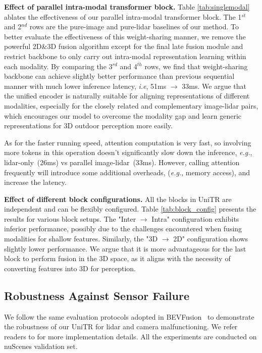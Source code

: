 \documentclass[10pt,twocolumn,letterpaper]{article}
\begin{document}
\noindent \textbf{Effect of parallel intra-modal transformer block.} Table \ref{tab:singlemodal} ablates the effectiveness of our parallel intra-modal transformer block. The 1$^{st}$ and 2$^{nd}$ rows are the pure-image and pure-lidar baselines of our method. To better evaluate the effectiveness of this weight-sharing manner, we remove the powerful 2D\&3D fusion algorithm except for the final late fusion module and restrict backbone to only carry out intra-modal representation learning within each modality. By comparing the 3$^{rd}$ and 4$^{th}$ rows, we find that weight-sharing backbone can achieve slightly better performance than previous sequential manner with much lower inference latency, \emph{i.e}, 51ms $\rightarrow$ 33ms.  We argue that the unified encoder is naturally suitable for aligning representations of different modalities, especially for the closely related and complementary image-lidar pairs, which encourages our model to overcome the modality gap and learn generic representations for 3D outdoor perception more easily. 

As for the faster running speed, attention computation is very fast, so involving more tokens in this operation doesn't significantly slow down the inference, \emph{e.g.}, lidar-only~(26ms) vs parallel image-lidar~(33ms). However, calling attention frequently will introduce some additional overheads, (\textit{e.g.}, memory access), and increase the latency. 


\noindent \textbf{Effect of different block configurations.} All the blocks in UniTR are independent and can be flexibly configured. Table \ref{tab:block_config} presents the results for various block setups. The "Inter $\rightarrow$ Intra" configuration exhibits inferior performance, possibly due to the challenges encountered when fusing modalities for shallow features. Similarly, the "3D $\rightarrow$ 2D" configuration shows slightly lower performance.  We argue that it is more advantageous for the last block to perform fusion in the 3D space, as it aligns with the necessity of converting features into 3D for perception.
\subsection{Robustness Against Sensor Failure}
We follow the same evaluation protocols adopted in BEVFusion~\cite{liang2022bevfusion} to demonstrate the robustness of our UniTR for lidar and camera malfunctioning. We refer readers to \cite{yu2022benchmarking,liang2022bevfusion} for more implementation details. All the experiments are conducted on nuScenes validation set. 
\end{document}
